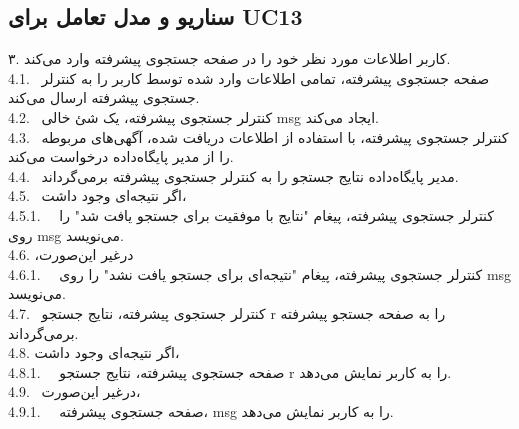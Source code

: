 \documentclass[12pt]{article}
\begin{document}
	\subsection{سناریو و مدل تعامل برای UC13}
	۳. کاربر اطلاعات مورد نظر خود را در صفحه جستجوی پیشرفته وارد می‌کند.\\
	4.1. \ صفحه جستجوی پیشرفته، تمامی اطلاعات وارد شده توسط کاربر را به کنترلر جستجوی پیشرفته ارسال می‌کند.\\
	4.2. \ کنترلر جستجوی پیشرفته، یک شئ خالی msg ایجاد می‌کند.\\
	4.3. \ کنترلر جستجوی پیشرفته، با استفاده از اطلاعات دریافت شده، آگهی‌های مربوطه را از مدیر پایگاه‌داده درخواست می‌کند.\\
	4.4. \ مدیر پایگاه‌داده نتایج جستجو را به کنترلر جستجوی پیشرفته برمی‌گرداند.\\
	4.5. \ اگر نتیجه‌ای وجود داشت،\\
	4.5.1. \ \ کنترلر جستجوی پیشرفته، پیغام "نتایج با موفقیت برای جستجو یافت شد" را روی msg می‌نویسد.\\
	4.6.  ‫درﻏﻴﺮ‬ ‫اﻳﻦ‬‌ﺻﻮرت‪،‬‬\\
	4.6.1. \ \ کنترلر جستجوی پیشرفته، پیغام "نتیجه‌ای برای جستجو یافت نشد" را روی msg می‌نویسد.\\
	4.7. \ کنترلر جستجوی پیشرفته، نتایج جستجو r را به صفحه جستجو پیشرفته برمی‌گرداند.\\
	4.8.  اگر نتیجه‌ای وجود داشت،\\
	4.8.1. \ \ صفحه جستجوی پیشرفته، نتایج جستجو r را به کاربر نمایش می‌دهد.\\
	4.9. \ در‌غیر این‌صورت،\\
	4.9.1. \ \ صفحه جستجوی پیشرفته، msg را به کاربر نمایش می‌دهد.\\
\end{document}
